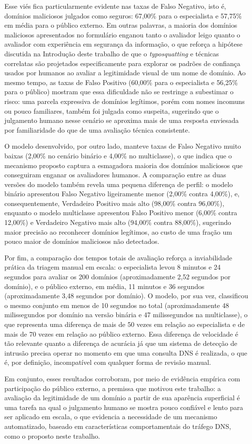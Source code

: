 Esse viés fica particularmente evidente nas taxas de Falso Negativo, isto é, domínios maliciosos julgados como seguros: 67,00\% para o especialista e 57,75\% em média para o público externo. Em outras palavras, a maioria dos domínios maliciosos apresentados no formulário enganou tanto o avaliador leigo quanto o avaliador com experiência em segurança da informação, o que reforça a hipótese discutida na Introdução deste trabalho de que o \textit{typosquatting} e técnicas correlatas são projetados especificamente para explorar os padrões de confiança usados por humanos ao avaliar a legitimidade visual de um nome de domínio. Ao mesmo tempo, as taxas de Falso Positivo (60,00\% para o especialista e 56,25\% para o público) mostram que essa dificuldade não se restringe a subestimar o risco: uma parcela expressiva de domínios legítimos, porém com nomes incomuns ou pouco familiares, também foi julgada como suspeita, sugerindo que o julgamento humano nesse cenário se aproxima mais de uma resposta enviesada por familiaridade do que de uma avaliação técnica consistente.

O modelo desenvolvido, por outro lado, manteve taxas de Falso Negativo muito baixas (2,00\% no cenário binário e 4,00\% no multiclasse), o que indica que o mecanismo proposto captura a esmagadora maioria dos domínios maliciosos que conseguiram enganar os avaliadores humanos. A comparação entre as duas versões do modelo também revela uma pequena diferença de perfil: o modelo binário apresentou Falso Negativo ligeiramente menor (2,00\% contra 4,00\%), e, consequentemente, Verdadeiro Positivo mais alto (98,00\% contra 96,00\%), enquanto o modelo multiclasse apresentou Falso Positivo menor (6,00\% contra 12,00\%) e Verdadeiro Negativo mais alto (94,00\% contra 88,00\%), sugerindo maior precisão ao reconhecer domínios legítimos, ao custo de uma fração um pouco maior de domínios maliciosos não detectados.

Por fim, a comparação dos tempos totais de avaliação reforça a inviabilidade prática da triagem manual em escala: o especialista levou 8 minutos e 24 segundos para avaliar os 200 domínios (aproximadamente 2,52 segundos por domínio), e o público externo, em média, 11 minutos e 36 segundos (aproximadamente 3,48 segundos por domínio). O modelo, por sua vez, classificou o mesmo conjunto em menos de 10 segundos no total (aproximadamente 48 milissegundos por domínio na versão binária e 47 milissegundos na multiclasse), o que representa uma diferença de mais de 50 vezes em relação ao especialista e de mais de 70 vezes em relação ao público externo. Essa diferença de velocidade é tão relevante quanto a diferença de acurácia já que um sistema de detecção de intrusão precisa operar no momento em que uma consulta DNS é realizada, o que é, por definição, incompatível com qualquer forma de revisão manual.

Em conjunto, esses resultados corroboram, por meio de evidência empírica com participação do público externo, a premissa que motivou este trabalho: a avaliação da legitimidade de um domínio a partir de sua aparência superficial é uma tarefa na qual o julgamento humano se mostra pouco confiável e lento para ser aplicado em escala, o que evidencia a necessidade de um mecanismo automatizado, baseado em características comportamentais do tráfego DNS, como o proposto neste trabalho.